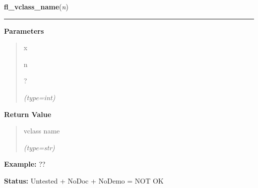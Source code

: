     \label{xformslib:flxbasic:fl_vclass_name}

    \vspace{0.5ex}

\hspace{.8\funcindent}\begin{boxedminipage}{\funcwidth}

    \raggedright \textbf{fl\_vclass\_name}(\textit{n})

    \vspace{-1.5ex}

    \rule{\textwidth}{0.5\fboxrule}
\setlength{\parskip}{2ex}
\setlength{\parskip}{1ex}
      \textbf{Parameters}
      \vspace{-1ex}

      \begin{quote}
        \begin{Ventry}{x}

          \item[n]

          ?

            {\it (type=int)}

        \end{Ventry}

      \end{quote}

      \textbf{Return Value}
    \vspace{-1ex}

      \begin{quote}
      vclass name

      {\it (type=str)}

      \end{quote}

\textbf{Example:} ??



\textbf{Status:} Untested + NoDoc + NoDemo = NOT OK



    \end{boxedminipage}

    \label{xformslib:flxbasic:fl_vclass_val}

    \vspace{0.5ex}

